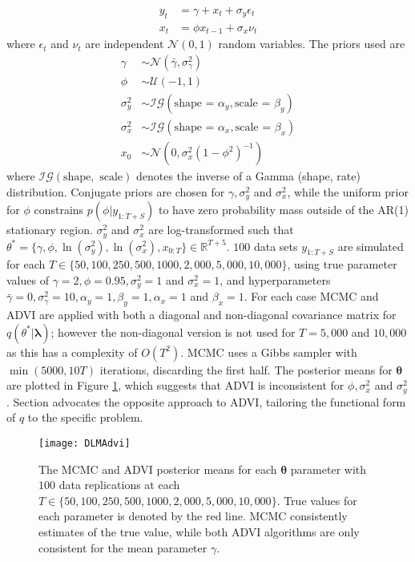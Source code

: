 \documentclass[12pt,a4paper]{article}%
\numberwithin{equation}{section}
\begin{document}
{{\begin{align}
y_t &= \gamma + x_t + \sigma_y \epsilon_t \label{DLM:Measure}\\
x_t &= \phi x_{t-1} + \sigma_x \nu_t \label{DLM:Transition}
\end{align}
where $\epsilon_t$ and $\nu_t$ are independent $\mathcal{N}(0, 1)$ random variables. The priors used are
\begin{align}
\gamma &\sim \mathcal{N}(\bar{\gamma}, \sigma^2_{\gamma}) \\
\phi &\sim \mathcal{U}(-1, 1) \\
\sigma^2_y &\sim \mathcal{IG}(\mbox{shape = }\alpha_y, \mbox{scale = }\beta_y) \\
\sigma^2_x &\sim \mathcal{IG}(\mbox{shape = }\alpha_x, \mbox{scale = }\beta_x) \\
x_0 &\sim \mathcal{N}(0, \sigma^2_x(1 - \phi^2)^{-1})
\end{align}
where $\mathcal{IG}(\mbox{shape}, \mbox{ scale})$ denotes the inverse of a Gamma (shape, rate) distribution. Conjugate priors are chosen for $\gamma, \sigma^2_y$ and $\sigma^2_x$, while the uniform prior for $\phi$ constrains $p(\phi | y_{1:T+S})$ to have zero probability mass outside of the AR(1) stationary region. $\sigma^2_y$ and $\sigma^2_x$ are log-transformed such that $\theta^* = \{\gamma, \phi, \ln(\sigma^2_y), \ln(\sigma^2_x), x_{0:T}\} \in \mathbb{R}^{T+5}$. $100$ data sets $y_{1:T+S}$ are simulated for each $T \in \{50, 100, 250, 500, 1000, 2,000, 5,000, 10,000\}$, using true parameter values of $\gamma = 2, \phi = 0.95, \sigma^2_y = 1$ and $\sigma^2_x=1$, and hyperparameters $\bar{\gamma} = 0, \sigma^2_{\gamma} = 10, \alpha_y = 1, \beta_y = 1, \alpha_x = 1$ and $\beta_x = 1$. For each case MCMC and ADVI are applied with both a diagonal and non-diagonal covariance matrix for $q(\theta^* | \boldsymbol{\lambda})$; however the non-diagonal version is not used for $T = 5,000$ and $10,000$ as this has a complexity of $O(T^2)$. MCMC uses a Gibbs sampler with $\min(5000, 10T)$ iterations, discarding the first half. The posterior means for $\boldsymbol{\theta}$ are plotted in Figure \ref{fig:DLM:ADVI}, which suggests that ADVI is inconsistent for $\phi, \sigma^2_x$ and $\sigma^2_y$. Section \label{MIVB} advocates the opposite approach to ADVI, tailoring the functional form of $q$ to the specific problem.

\begin{figure}[h]
\centering
\texttt{[image: DLMAdvi]}
\caption{The MCMC and ADVI posterior means for each $\boldsymbol{\theta}$ parameter with $100$ data replications at each $T \in \{50, 100, 250, 500, 1000, 2,000, 5,000, 10,000\}$. True values for each parameter is denoted by the red line. MCMC consistently estimates of the true value, while both ADVI algorithms are only consistent for the mean parameter $\gamma$.
}
\label{fig:DLM:ADVI}
\end{figure}

}}
\end{document}
